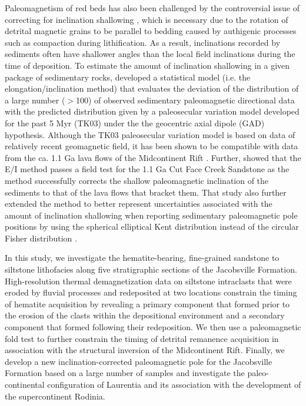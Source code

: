 \documentclass[draft]{agujournal2019}
\begin{document}
Paleomagnetism of red beds has also been challenged by the controversial issue of correcting for inclination shallowing \cite{King1955a, Tauxe2004b, Bilardello2016b}, which is necessary due to the rotation of detrital magnetic grains to be parallel to bedding caused by authigenic processes such as compaction during lithification. As a result, inclinations recorded by sediments often have shallower angles than the local field inclinations during the time of deposition. To estimate the amount of inclination shallowing in a given package of sedimentary rocks,  developed a statistical model (i.e. the elongation/inclination method) that evaluates the deviation of the distribution of a large number ($>$100) of observed sedimentary paleomagnetic directional data with the predicted distribution given by a paleosecular variation model developed for the past 5 Myr (TK03) under the the geocentric axial dipole (GAD) hypothesis. Although the TK03 paleosecular variation model is based on data of relatively recent geomagnetic field, it has been shown to be compatible with data from the ca. 1.1 Ga lava flows of the Midcontinent Rift \cite{Tauxe2009a}. Further,  showed that the E/I method passes a field test for the 1.1 Ga Cut Face Creek Sandstone as the method successfully corrects the shallow paleomagnetic inclination of the sediments to that of the lava flows that bracket them. That study also further extended the method to better represent uncertainties associated with the amount of inclination shallowing when reporting sedimentary paleomagnetic pole positions by using the spherical elliptical Kent distribution \cite{Kent1982a} instead of the circular Fisher distribution \cite{Fisher1953a}. 

In this study, we investigate the hematite-bearing, fine-grained sandstone to siltstone lithofacies along five stratigraphic sections of the Jacobsville Formation. High-resolution thermal demagnetization data on siltstone intraclasts that were eroded by fluvial processes and redeposited at two locations constrain the timing of hematite acquisition by revealing a primary component that formed prior to the erosion of the clasts within the depositional environment and a secondary component that formed following their redeposition. We then use a paleomagnetic fold test to further constrain the timing of detrital remanence acquisition in association with the structural inversion of the Midcontinent Rift. Finally, we develop a new inclination-corrected paleomagnetic pole for the Jacobsville Formation based on a large number of samples and investigate the paleo-continental configuration of Laurentia and its association with the development of the supercontinent Rodinia. 
\end{document}
